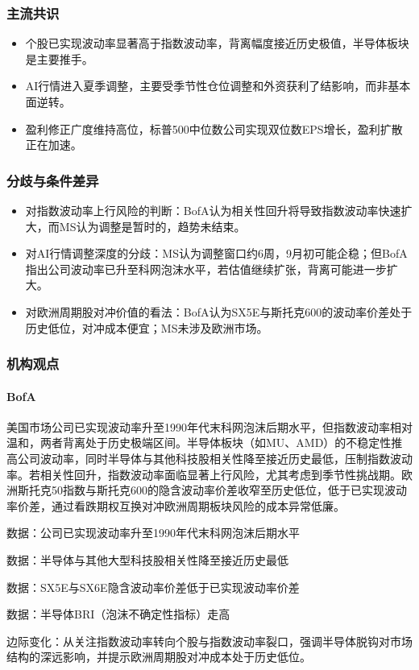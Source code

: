 \documentclass[11pt]{ctexart}
\begin{document}
\subsubsection*{主流共识}
\begin{itemize}
  \item 个股已实现波动率显著高于指数波动率，背离幅度接近历史极值，半导体板块是主要推手。
  \item AI行情进入夏季调整，主要受季节性仓位调整和外资获利了结影响，而非基本面逆转。
  \item 盈利修正广度维持高位，标普500中位数公司实现双位数EPS增长，盈利扩散正在加速。
\end{itemize}
\subsubsection*{分歧与条件差异}
\begin{itemize}
  \item 对指数波动率上行风险的判断：BofA认为相关性回升将导致指数波动率快速扩大，而MS认为调整是暂时的，趋势未结束。
  \item 对AI行情调整深度的分歧：MS认为调整窗口约6周，9月初可能企稳；但BofA指出公司波动率已升至科网泡沫水平，若估值继续扩张，背离可能进一步扩大。
  \item 对欧洲周期股对冲价值的看法：BofA认为SX5E与斯托克600的波动率价差处于历史低位，对冲成本便宜；MS未涉及欧洲市场。
\end{itemize}
\subsubsection*{机构观点}
\paragraph{BofA} 美国市场公司已实现波动率升至1990年代末科网泡沫后期水平，但指数波动率相对温和，两者背离处于历史极端区间。半导体板块（如MU、AMD）的不稳定性推高公司波动率，同时半导体与其他科技股相关性降至接近历史最低，压制指数波动率。若相关性回升，指数波动率面临显著上行风险，尤其考虑到季节性挑战期。欧洲斯托克50指数与斯托克600的隐含波动率价差收窄至历史低位，低于已实现波动率价差，通过看跌期权互换对冲欧洲周期板块风险的成本异常低廉。
{\small\color{refgray}数据：公司已实现波动率升至1990年代末科网泡沫后期水平\par}
{\small\color{refgray}数据：半导体与其他大型科技股相关性降至接近历史最低\par}
{\small\color{refgray}数据：SX5E与SX6E隐含波动率价差低于已实现波动率价差\par}
{\small\color{refgray}数据：半导体BRI（泡沫不确定性指标）走高\par}
{\small\color{refgray}边际变化：从关注指数波动率转向个股与指数波动率裂口，强调半导体脱钩对市场结构的深远影响，并提示欧洲周期股对冲成本处于历史低位。\par}
\end{document}
